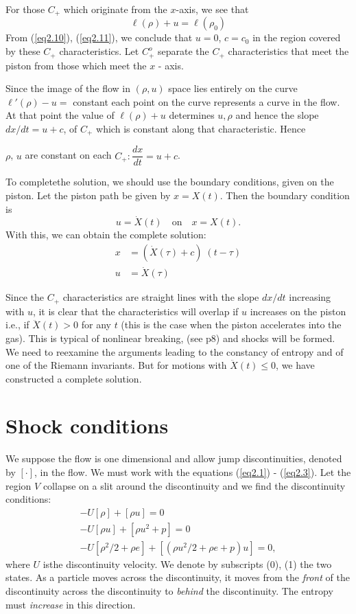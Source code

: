 For those $C_+$ which originate from the $x$-axis, we see that
\begin{equation*}
\ell (\rho) + u = \ell (\rho_0)\tag{2.11}\label{eq2.11}
\end{equation*}
From (\ref{eq2.10}), (\ref{eq2.11}), we conclude that $u=0$, $c = c_0$ in the region covered by these $C_+$ characteristics. Let $C^o_+$ separate the $C_+$ characteristics that meet the piston from those which meet the $x$ - axis.

Since the image of the flow in $(\rho, u)$ space lies entirely on the curve $\ell'(\rho) - u = $ constant each point on the curve represents a curve in the flow. At that point the value of $\ell (\rho ) + u$ determines $u,\rho$ and hence the slope $dx/dt = u + c$,  of $C_+$ which is constant along that characteristic. Hence

$\rho$, $u$ are constant on each $C_+ : \dfrac{dx}{dt} = u + c$. 

To complete\pageoriginale the solution, we should use the boundary conditions, given on the piston. Let the piston path be given by $x = X(t)$. Then the boundary condition is 
$$
u = \dot{X}(t) \quad \text{on} \quad x = X(t).
$$
With this, we can obtain the complete solution:
\begin{align*}
 x & = (\dot{X} (\tau) + c) \; (t-\tau)\\
 u & = \dot{X} (\tau)
\end{align*}

Since the $C_+$ characteristics are straight lines with the slope $dx/dt$ increasing with $u$, it is clear that the characteristics will overlap if $u$ increases on the piston i.e., if $\ddot{X}(t) > 0$ for any $t$ (this is the case when the piston accelerates into the gas). This is typical of nonlinear breaking, (see p8) and shocks will be formed. We need to reexamine the arguments leading to the constancy of entropy and of one of the Riemann invariants. But for motions with $\ddot{X}(t) \leq 0$, we have constructed a complete solution.

\section{Shock conditions}\label{chap2:sec2.4}

We suppose the flow is one dimensional and allow jump discontinuities, denoted by $[\cdot]$, in the flow. We must work with the equations (\ref{eq2.1}) - (\ref{eq2.3}). Let the region $V$ collapse on a slit around the discontinuity and we find the discontinuity conditions:
\begin{gather*}
- U[\rho] + [\rho u] = 0\\
- U[\rho u] + [\rho u^2 + p] = 0\\
- U [\rho^2 / 2 + \rho e] + [(\rho u^2 / 2 + \rho e + p) u] = 0,  
\end{gather*}
where $U$ is\pageoriginale the discontinuity velocity. We denote by subscripts (0), (1) the two states. As a particle moves across the discontinuity, it moves from the {\em front} of the discontinuity across the discontinuity to {\em behind} the discontinuity. The entropy must {\em increase} in this direction.

